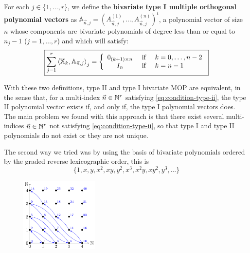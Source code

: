\documentclass[portrait,final,a0paper,fontscale=0.38]{baposter}
\begin{document}
\begin{poster}
{  \begin{definition}
    For each $j\in\{1,\dots,r\}$, we define the \textbf{bivariate type I multiple orthogonal polynomial vectors} as $\mathbb A_{\vec n, j}= (A_{\vec n, j}^{(1)}, \dots, A_{\vec n, j}^{(n)})^t $, a polynomial vector of size $n$ whose components are bivariate polynomials of degree less than or equal to $n_j-1$ ($j=1,\dots,r$) and which will satisfy:
    \begin{equation}
      \label{eq:condition-type-I}
      \boxed{\sum_{j=1}^r \left\langle \mathbb X_k , \mathbb A_{\vec n,j} \right\rangle_j = \left\{\begin{array}{ccl}
          0_{(k+1)\times n} &   \text{ if } & k=0,\dots,n-2 \\
          I_n & \text{ if } & k=n-1      
      \end{array}\right.}
    \end{equation}
  \end{definition}
  
  With these two definitions, type II and type I bivariate MOP are equivalent, in the sense that, for a multi-index $\vec n\in\mathbb{N}^r$ satisfying \eqref{eq:condition-type-ii}, the type II polynomial vector exists if, and only if, the type I polynomial vectors does. The main problem we found with this approach is that there exist several multi-indices $\vec n\in\mathbb{N}^r$ not satisfying \eqref{eq:condition-type-ii}, so that type I and type II polynomials do not exist or they are not unique.


}

{

The second way we tried was by using the basis of bivariate polynomials ordered by the graded reverse lexicographic order, this is
$$\{1,x,y,x^2,xy,y^2,x^3,x^2y,xy^2,y^3,\dots\}$$
\begin{figure}
  \includegraphics[width=0.35\textwidth]{Cantor}
  \label{fig:ejemplo}
\end{figure}

}
\end{poster}
\end{document}
